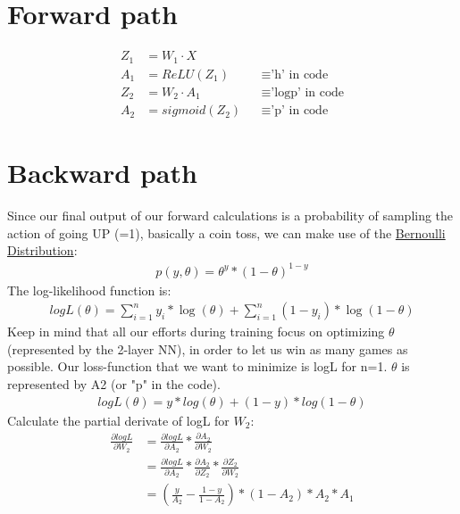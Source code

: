 \documentclass{article} %
\begin{document}
    
    \section{Forward path} 
    \begin{align*}
        Z_{1} &= W_{1} \cdot X \\
        A_{1} &= ReLU(Z_{1}) && \equiv \text{'h' in code} \\
        Z_{2} &= W_{2} \cdot A_{1} && \equiv \text{'logp' in code} \\
        A_{2} &= sigmoid(Z_{2}) && \equiv \text{'p' in code}
    \end{align*}
    
    \section{Backward path}
    Since our final output of our forward calculations is a probability of sampling the action of going UP (=1),
    basically a coin toss, we can make use of the \href{https://en.wikipedia.org/wiki/Bernoulli_distribution}{Bernoulli Distribution}:
    \begin{align*}
        p(y, \theta) = \theta^y * (1 - \theta)^{1 - y}
    \end{align*}
    The log-likelihood function is:
    \begin{align*}
        logL(\theta) = \sum_{i=1}^{n} y_{i} * \log(\theta) + \sum_{i=1}^{n} (1 - y_{i}) * \log(1 - \theta)
    \end{align*}
    Keep in mind that all our efforts during training focus on optimizing $\theta$ (represented by the 2-layer NN), in order to let us win as many games as possible.  
    Our loss-function that we want to minimize is logL for n=1. $\theta$ is represented by A2 (or "p" in the code).
    \begin{align*}
        logL(\theta) = y * log(\theta) + (1 - y) * log(1 - \theta)
    \end{align*}
    Calculate the partial derivate of logL for $W_{2}$:
    \begin{align*}
        \frac{\partial logL}{\partial W_{2}} &= \frac{\partial logL}{\partial A_{2}} * \frac{\partial A_{2}}{\partial W_{2}} \\
        &= \frac{\partial logL}{\partial A_{2}} * \frac{\partial A_{2}}{\partial Z_{2}}  * \frac{\partial Z_{2}}{\partial W_{2}} \\
        &= (\frac{y}{A_{2}} - \frac{1 - y}{1 - A_{2}}) * (1 - A_{2}) * A_{2}  * A_{1} \\
    \end{align*}
\end{document}
